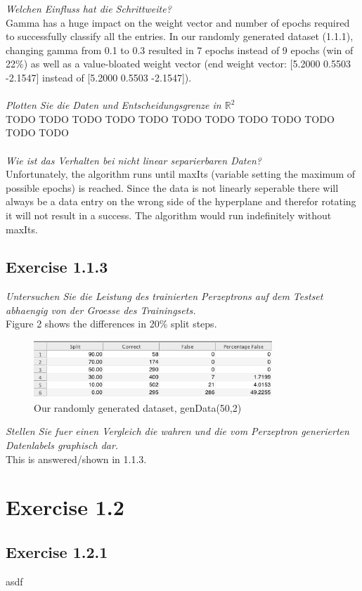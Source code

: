 \documentclass[12pt]{article}
\def\x#1#2{$\mathbb{#1}^#2$}
\def\n#1{\x#1}
\begin{document}
\textit{Welchen Einfluss hat die Schrittweite?}
\\
Gamma has a huge impact on the weight vector and number of epochs required to successfully classify all the entries. In our randomly generated dataset (1.1.1), changing gamma from 0.1 to 0.3 resulted in 7 epochs instead of 9 epochs (win of 22\%) as well as a value-bloated weight vector (end weight vector:  [5.2000 0.5503 -2.1547] instead of [5.2000 0.5503 -2.1547]).
\\
\\


\textit{Plotten Sie die Daten und Entscheidungsgrenze in \n{R2}}
\\
TODO TODO TODO TODO TODO TODO TODO TODO TODO TODO TODO TODO
\\
\\

\textit{Wie ist das Verhalten bei nicht linear separierbaren Daten?}
\\
Unfortunately, the algorithm runs until maxIts (variable setting the maximum of possible epochs) is reached. Since the data is not linearly seperable there will always be a data entry on the wrong side of the hyperplane and therefor rotating it will not result in a success. The algorithm would run indefinitely without maxIts. 

\subsection{Exercise 1.1.3}
\textit{Untersuchen Sie die Leistung des trainierten Perzeptrons auf dem Testset abhaengig von der Groesse des Trainingsets.}
\\
Figure 2 shows the differences in 20\% split steps.
\\
\begin{figure}[htp]
	\centering
	\includegraphics[width=0.8\textwidth]{ab1_1_3}
	\caption{Our randomly generated dataset, genData(50,2)}\label{fig:1}
\end{figure}

\textit{Stellen Sie fuer einen Vergleich die wahren und die vom Perzeptron generierten Datenlabels graphisch dar.}
\\
This is answered/shown in 1.1.3.

\section{Exercise 1.2}
\subsection{Exercise 1.2.1}
asdf
\end{document}
